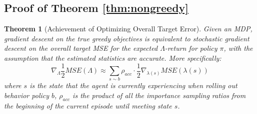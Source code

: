 \documentclass{article}
\newtheorem{theorem}{Theorem}[section]
\begin{document}
\subsection{Proof of Theorem \ref{thm:nongreedy}}
\begin{theorem}[Achievement of Optimizing Overall Target Error]
Given an MDP, gradient descent on the true greedy objectives is equivalent to stochastic gradient descent on the overall target MSE for the expected $\Lambda$-return for policy $\pi$, with the assumption that the estimated statistics are accurate. More specifically:
$$\nabla_{\Lambda} \frac{1}{2} MSE(\Lambda) \approx \sum_{s \sim b}{\rho_{acc} \cdot \frac{1}{2} \nabla_{\lambda(s)} MSE(\lambda(s))}$$
where $s$ is the state that the agent is currently experiencing when rolling out behavior policy $b$, $\rho_{acc}$ is the product of all the importance sampling ratios from the beginning of the current episode until meeting state $s$.
\end{theorem}
\end{document}
